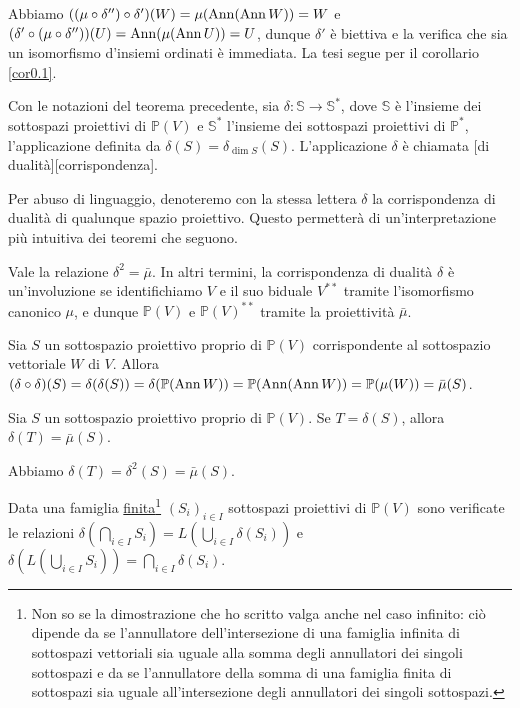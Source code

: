 	\par Abbiamo $((\mu \circ \delta'') \circ \delta')(W) = \mu(\operatorname{Ann} (\operatorname{Ann} W)) = W$ e $(\delta' \circ (\mu \circ \delta''))(U) = \operatorname{Ann} (\mu(\operatorname{Ann} U)) = U$, dunque $\delta'$ \`e biettiva e la verifica che sia un isomorfismo d'insiemi ordinati \`e immediata. La tesi segue per il corollario \ref{cor0.1}. \EndProof
\begin{Definition}\label{def26}
	Con le notazioni del teorema precedente, sia $\delta: \mathbb{S} \rightarrow \mathbb{S}^*$, dove $\mathbb{S}$ \`e l'insieme dei sottospazi proiettivi di $\mathbb{P}(V)$ e $\mathbb{S}^*$ l'insieme dei sottospazi proiettivi di $\mathbb{P}^*$, l'applicazione definita da $\delta(S) = \delta_{\dim S} (S)$. L'applicazione $\delta$ \`e chiamata [di dualit\`a][corrispondenza].
\end{Definition}
\par Per abuso di linguaggio, denoteremo con la stessa lettera $\delta$ la corrispondenza di dualit\`a di qualunque spazio proiettivo. Questo permetter\`a di un'interpretazione pi\`u intuitiva dei teoremi che seguono.
\begin{Theorem}\label{th25.1}
	Vale la relazione $\delta^2 = \bar{\mu}$. In altri termini, la corrispondenza di dualit\`a $\delta$ \`e un'involuzione se identifichiamo $V$ e il suo biduale $V^{**}$ tramite l'isomorfismo canonico $\mu$, e dunque $\mathbb{P}(V)$ e $\mathbb{P}(V)^{**}$ tramite la proiettivit\`a $\bar{\mu}$.
\end{Theorem}
\Proof Sia $S$ un sottospazio proiettivo proprio di $\mathbb{P}(V)$ corrispondente al sottospazio vettoriale $W$ di $V$. Allora $(\delta \circ \delta)(S) = \delta(\delta(S)) = \delta(\mathbb{P}(\operatorname{Ann} W)) = \mathbb{P}(\operatorname{Ann} (\operatorname{Ann} W)) = \mathbb{P}(\mu(W)) = \bar{\mu}(S)$. \EndProof
\begin{Corollary}\label{corth25.1}
	Sia $S$ un sottospazio proiettivo proprio di $\mathbb{P}(V)$. Se $T = \delta(S)$, allora $\delta(T) = \bar{\mu}(S)$.
\end{Corollary}
\Proof Abbiamo $\delta(T) = \delta^2(S) = \bar{\mu}(S)$. \EndProof
\begin{Theorem}\label{th26}
	Data una famiglia \underline{finita}\footnote{Non so se la dimostrazione che ho scritto valga anche nel caso infinito: ci\`o dipende da se l'annullatore dell'intersezione di una famiglia infinita di sottospazi vettoriali sia uguale alla somma degli annullatori dei singoli sottospazi e da se l'annullatore della somma di una famiglia finita di sottospazi sia uguale all'intersezione degli annullatori dei singoli sottospazi.} $(S_i)_{i \in I}$ sottospazi proiettivi di $\mathbb{P}(V)$ sono verificate le relazioni $\delta(\bigcap_{i \in I} S_i) = L(\bigcup_{i \in I} \delta(S_i))$ e $\delta(L(\bigcup_{i \in I} S_i)) = \bigcap_{i \in I} \delta(S_i)$.
\end{Theorem}
